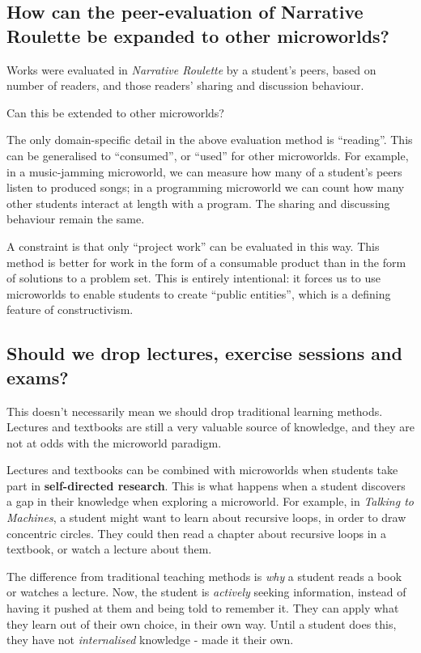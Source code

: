 \subsection{How can the peer-evaluation of Narrative Roulette be
expanded to other microworlds?}

Works were evaluated in \emph{Narrative Roulette} by a student's peers,
based on number of readers, and those readers' sharing and discussion
behaviour.

Can this be extended to other microworlds?

The only domain-specific detail in the above evaluation method is
``reading''. This can be generalised to ``consumed'', or ``used'' for
other microworlds. For example, in a music-jamming microworld, we can
measure how many of a student's peers listen to produced songs; in a
programming microworld we can count how many other students interact at
length with a program. The sharing and discussing behaviour remain the
same.

A constraint is that only ``project work'' can be evaluated in this way.
This method is better for work in the form of a consumable product than in the form of solutions to
a problem set. This is entirely intentional: it forces us to
use microworlds to enable students to create ``public entities'', which
is a defining feature of constructivism.

\subsection{Should we drop lectures, exercise sessions and exams?}

This doesn't necessarily mean we should drop traditional learning
methods. Lectures and textbooks are still a very valuable source of
knowledge, and they are not at odds with the microworld paradigm.

Lectures and textbooks can be combined with microworlds when students
take part in \textbf{self-directed research}. This is what happens when
a student discovers a gap in their knowledge when exploring a
microworld. For example, in \emph{Talking to Machines}, a student might
want to learn about recursive loops, in order to draw concentric
circles. They could then read a chapter about recursive loops in a
textbook, or watch a lecture about them.

The difference from traditional teaching methods is \emph{why} a student
reads a book or watches a lecture. Now, the student is \emph{actively}
seeking information, instead of having it pushed at them and being told
to remember it. They can apply what they learn out of their own choice,
in their own way. Until a student does this, they have not
\emph{internalised} knowledge - made it their own.


